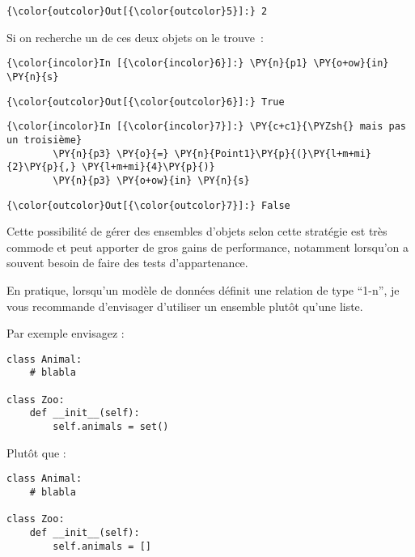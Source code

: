 \begin{Verbatim}[commandchars=\\\{\}]
{\color{outcolor}Out[{\color{outcolor}5}]:} 2
\end{Verbatim}
            
    Si on recherche un de ces deux objets on le trouve~:

    \begin{Verbatim}[commandchars=\\\{\}]
{\color{incolor}In [{\color{incolor}6}]:} \PY{n}{p1} \PY{o+ow}{in} \PY{n}{s}
\end{Verbatim}


\begin{Verbatim}[commandchars=\\\{\}]
{\color{outcolor}Out[{\color{outcolor}6}]:} True
\end{Verbatim}
            
    \begin{Verbatim}[commandchars=\\\{\}]
{\color{incolor}In [{\color{incolor}7}]:} \PY{c+c1}{\PYZsh{} mais pas un troisième}
        \PY{n}{p3} \PY{o}{=} \PY{n}{Point1}\PY{p}{(}\PY{l+m+mi}{2}\PY{p}{,} \PY{l+m+mi}{4}\PY{p}{)}
        \PY{n}{p3} \PY{o+ow}{in} \PY{n}{s}
\end{Verbatim}


\begin{Verbatim}[commandchars=\\\{\}]
{\color{outcolor}Out[{\color{outcolor}7}]:} False
\end{Verbatim}
            
    Cette possibilité de gérer des ensembles d'objets selon cette stratégie
est très commode et peut apporter de gros gains de performance,
notamment lorsqu'on a souvent besoin de faire des tests d'appartenance.

En pratique, lorsqu'un modèle de données définit une relation de type
``1-n'', je vous recommande d'envisager d'utiliser un ensemble plutôt
qu'une liste.

    Par exemple envisagez :

\begin{verbatim}
class Animal:
    # blabla
   
class Zoo:
    def __init__(self):
        self.animals = set()
\end{verbatim}

    Plutôt que :

\begin{verbatim}
class Animal:
    # blabla
   
class Zoo:
    def __init__(self):
        self.animals = []
\end{verbatim}


